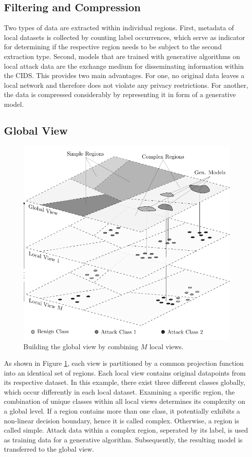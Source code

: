 \subsection{Filtering and Compression}\label{subsec:filtering_and_compression}

Two types of data are extracted within individual regions. First, metadata of local datasets is collected by counting label occurrences, which serve as indicator for determining if the respective region needs to be subject to the second extraction type. Second, models that are trained with generative algorithms on local attack data are the exchange medium for disseminating information within the CIDS. This provides two main advantages. For one, no original data leaves a local network and therefore does not violate any privacy restrictions. For another, the data is compressed considerably by representing it in form of a generative model. 

\subsection{Global View}\label{subsec:global_view}

\begin{figure}[b!]
    \centering
    \includegraphics[width=0.8\linewidth]{tikz/global_view.pdf}
    \caption{Building the global view by combining $M$ local views.}
    \label{fig:global_view}
\end{figure}


As shown in Figure \ref{fig:global_view}, each view is partitioned by a common projection function into an identical set of regions. Each local view contains original datapoints from its respective dataset. In this example, there exist three different classes globally, which occur differently in each local dataset. Examining a specific region, the combination of unique classes within all local views determines its complexity on a global level. If a region contains more than one class, it potentially exhibits a non-linear decision boundary, hence it is called complex. Otherwise, a region is called simple. Attack data within a complex region, seperated by its label, is used as training data for a generative algorithm. Subsequently, the resulting model is transferred to the global view. 


